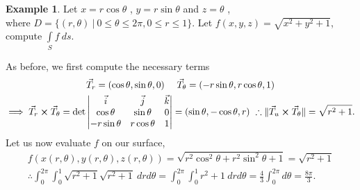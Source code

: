 \documentclass[
	12pt,
	]{article}
\DeclarePairedDelimiter{\norm}{\lVert}{\rVert}
\theoremstyle{custom}
\theoremstyle{custom}
\theoremstyle{custom}
\theoremstyle{custom}
\theoremstyle{custom}
\theoremstyle{definition}
\newtheorem{example}{Example}[section]
\theoremstyle{example}
\theoremstyle{note}
\theoremstyle{remark}
\theoremstyle{example}
\newcounter{theo}[section]\setcounter{theo}{0}
\numberwithin{equation}{subsection}
\begin{document}
				\begin{example}
					Let $x=r\cos \theta$ , $y=r\sin \theta$ and $z=\theta$ ,\\ where  $D = \{(r,\theta) \ | \ 0 \le \theta \le 2\pi , 0 \le r \le 1\}$. Let $f(x,y,z) = \sqrt{x^{2} + y^{2} +1}$, compute $\int\limits_{S} f\ ds.$
					
					\noindent As before, we first compute the necessary terms 
					\begin{gather*}
						\vec{T}_{r} = (\cos\theta , \sin\theta , 0) \ \ \ \ \vec{T}_{\theta} = (-r\sin\theta, r\cos\theta ,1) \\
						\implies \vec{T}_{r} \cross \vec{T}_{\theta} = \det 
						\begin{vmatrix}
							\vec{i} & \vec{j} & \vec{k} \\ \cos\theta & \sin\theta & 0 \\ -r\sin\theta& r\cos\theta & 1
						\end{vmatrix} = (\sin\theta , -\cos\theta, r) \ \therefore \norm{\vec{T}_{u} \cross \vec{T}_{\theta}} = \sqrt{r^{2}+1}.
					\end{gather*}
					Let us now evaluate $f$ on our surface, 
					\begin{gather*}
						f(x(r,\theta) , y(r,\theta) , z(r,\theta)) = \sqrt{r^{2}\cos^{2} \theta + r^{2}\sin^{2} \theta +1} = \sqrt{r^{2}+1 } \\
						\therefore \int_{0}^{2\pi} \int_{0}^{1} \sqrt{r^{2} +1} \sqrt{r^{2} +1} \ drd\theta = \int_{0}^{2\pi } \int_{0}^{1} r^{2} +1 \ drd\theta =\frac43 \int_{0}^{2\pi} d\theta = \frac{8\pi}{3}.
 					\end{gather*}
				\end{example}
				
\end{document}

